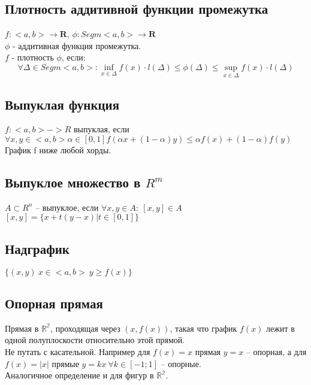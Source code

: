 \documentclass[../main.tex]{subfiles}
\begin{document}
\subsection{Плотность аддитивной функции промежутка}
$f: <a,b> \rightarrow \mathbf{R}$, $\phi : Segm<a,b> \rightarrow \mathbf{R}$ \\ 
$\phi$ - аддитивная функция промежутка. \\
$f$ - плотность $\phi$, если: \\ 
$$\forall \Delta \in Segm<a, b> : \inf_{x \in \Delta} f(x) \cdot l(\Delta) \leq \phi (\Delta) \leq \sup_{x \in \Delta} f(x) \cdot l(\Delta)$$


\subsection{Выпуклая функция}
$f:<a,b> -> R$ выпуклая, если
$$$$
$\forall x, y \in <a, b> \alpha \in [0,1] f(\alpha x + (1 - \alpha)y) \leq \alpha f(x) + (1 - \alpha)f(y)$
$$$$
График f ниже любой хорды.


\subsection{Выпуклое множество в $R^m$}
$A \subset R^n$ -- выпуклое, если $\forall x, y \in A : \ [x, y] \in A$
$$$$
$[x, y] = \{x + t(y - x)| t \in [0, 1]\}$


\subsection{Надграфик}
$\{(x,y) \ x \in <a, b> \ y \geq f(x)\}$

\newpage

\subsection{Опорная прямая}
Прямая в $\mathbb{R^2}$, проходящая через $(x, f(x))$, такая что график $f(x)$ лежит в одной полуплоскости относительно этой прямой. \\
Не путать с касательной. Например для $f(x) = x$ прямая $y = x$ -- опорная, а для $f(x) = |x|$ прямые $y = kx \ \forall k \in [-1; 1]$ -- опорные. \\
Аналогичное определение и для фигур в $\mathbb{R^2}$.
\newpage
\end{document}

